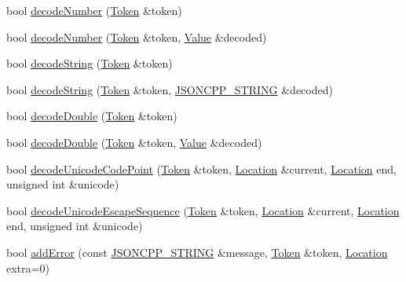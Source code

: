 \begin{DoxyCompactItemize}
\item 
bool \hyperlink{class_json_1_1_our_reader_a272d271290933a89abfd5096dd69c9e9}{decode\+Number} (\hyperlink{class_json_1_1_our_reader_1_1_token}{Token} \&token)
\item 
bool \hyperlink{class_json_1_1_our_reader_a712270d53a2f023c2f406ac813548340}{decode\+Number} (\hyperlink{class_json_1_1_our_reader_1_1_token}{Token} \&token, \hyperlink{class_json_1_1_value}{Value} \&decoded)
\item 
bool \hyperlink{class_json_1_1_our_reader_a34e31d8b8399b7ad493359702b6de6c9}{decode\+String} (\hyperlink{class_json_1_1_our_reader_1_1_token}{Token} \&token)
\item 
bool \hyperlink{class_json_1_1_our_reader_a5046dfa5d43b1770a091aac0a63a9f4b}{decode\+String} (\hyperlink{class_json_1_1_our_reader_1_1_token}{Token} \&token, \hyperlink{json_8h_a1e723f95759de062585bc4a8fd3fa4be}{J\+S\+O\+N\+C\+P\+P\+\_\+\+S\+T\+R\+I\+NG} \&decoded)
\item 
bool \hyperlink{class_json_1_1_our_reader_a1d1c3b44f6720a0e7c39b5ae8de3981c}{decode\+Double} (\hyperlink{class_json_1_1_our_reader_1_1_token}{Token} \&token)
\item 
bool \hyperlink{class_json_1_1_our_reader_aa5c15a8cd32754f07430dedba3d1308e}{decode\+Double} (\hyperlink{class_json_1_1_our_reader_1_1_token}{Token} \&token, \hyperlink{class_json_1_1_value}{Value} \&decoded)
\item 
bool \hyperlink{class_json_1_1_our_reader_ac1bf03c161ece082e48da450c50f528d}{decode\+Unicode\+Code\+Point} (\hyperlink{class_json_1_1_our_reader_1_1_token}{Token} \&token, \hyperlink{class_json_1_1_our_reader_a1bdc7bbc52ba87cae6b19746f2ee0189}{Location} \&current, \hyperlink{class_json_1_1_our_reader_a1bdc7bbc52ba87cae6b19746f2ee0189}{Location} end, unsigned int \&unicode)
\item 
bool \hyperlink{class_json_1_1_our_reader_adb39be814cc6076b91a0919bdd5b24b0}{decode\+Unicode\+Escape\+Sequence} (\hyperlink{class_json_1_1_our_reader_1_1_token}{Token} \&token, \hyperlink{class_json_1_1_our_reader_a1bdc7bbc52ba87cae6b19746f2ee0189}{Location} \&current, \hyperlink{class_json_1_1_our_reader_a1bdc7bbc52ba87cae6b19746f2ee0189}{Location} end, unsigned int \&unicode)
\item 
bool \hyperlink{class_json_1_1_our_reader_aa6a920311e6408ff3a45324d49da18a6}{add\+Error} (const \hyperlink{json_8h_a1e723f95759de062585bc4a8fd3fa4be}{J\+S\+O\+N\+C\+P\+P\+\_\+\+S\+T\+R\+I\+NG} \&message, \hyperlink{class_json_1_1_our_reader_1_1_token}{Token} \&token, \hyperlink{class_json_1_1_our_reader_a1bdc7bbc52ba87cae6b19746f2ee0189}{Location} extra=0)

\end{DoxyCompactItemize}
